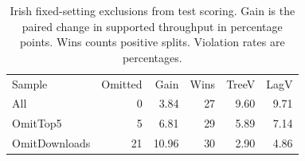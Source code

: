 \begin{table}[!ht]
\centering\small
\caption{Irish fixed-setting exclusions from test scoring. Gain is the paired change in supported throughput in percentage points. Wins counts positive splits. Violation rates are percentages.}
\begin{tabular}{lrrrrr}
\hline
Sample & Omitted & Gain & Wins & TreeV & LagV \\
All & 0 & 3.84 & 27 & 9.60 & 9.71 \\
OmitTop5 & 5 & 6.81 & 29 & 5.89 & 7.14 \\
OmitDownloads & 21 & 10.96 & 30 & 2.90 & 4.86 \\
\hline
\end{tabular}
\end{table}
